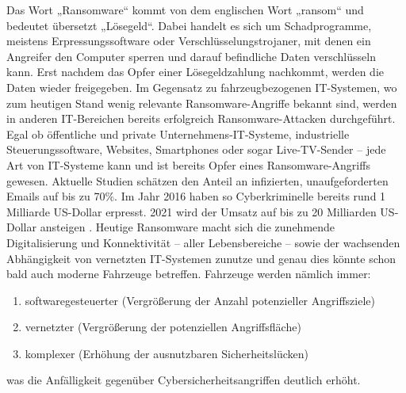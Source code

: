 Das Wort „Ransomware“ kommt von dem englischen Wort „ransom“ und 
bedeutet übersetzt „Lösegeld“. Dabei handelt es sich um Schadprogramme, 
meistens Erpressungssoftware oder Verschlüsselungstrojaner, mit denen ein 
Angreifer den Computer sperren und darauf befindliche Daten verschlüsseln 
kann. Erst nachdem das Opfer einer Lösegeldzahlung nachkommt, werden die 
Daten wieder freigegeben. 
\newline
Im Gegensatz zu fahrzeugbezogenen IT-Systemen, wo zum heutigen Stand wenig 
relevante Ransomware-Angriffe bekannt sind, werden in anderen IT-Bereichen 
bereits erfolgreich Ransomware-Attacken durchgeführt. Egal ob öffentliche und 
private Unternehmens-IT-Systeme, industrielle Steuerungssoftware, Websites, 
Smartphones oder sogar Live-TV-Sender – jede Art von IT-Systeme kann und ist 
bereits Opfer eines Ransomware-Angriffs gewesen. 
\newline
Aktuelle Studien schätzen den Anteil an infizierten, unaufgeforderten Emails auf 
bis zu 70$\%$. Im Jahr 2016 haben so Cyberkriminelle bereits rund 1 Milliarde US-Dollar 
erpresst. 2021 wird der Umsatz auf bis zu 20 Milliarden US-Dollar ansteigen \cite[vgl.]{C..24.05.2020}.  
\newline
Heutige Ransomware macht sich die zunehmende Digitalisierung und Konnektivität – aller 
Lebensbereiche – sowie der wachsenden Abhängigkeit von vernetzten IT-Systemen zunutze
und genau dies könnte schon bald auch moderne Fahrzeuge betreffen. 
Fahrzeuge werden nämlich immer:

\begin{enumerate}
    \item softwaregesteuerter (Vergrößerung der Anzahl potenzieller Angriffsziele)
    \item vernetzter (Vergrößerung der potenziellen Angriffsfläche)
    \item komplexer (Erhöhung der ausnutzbaren Sicherheitslücken)
\end{enumerate}
was die Anfälligkeit gegenüber Cybersicherheitsangriffen deutlich erhöht. 

